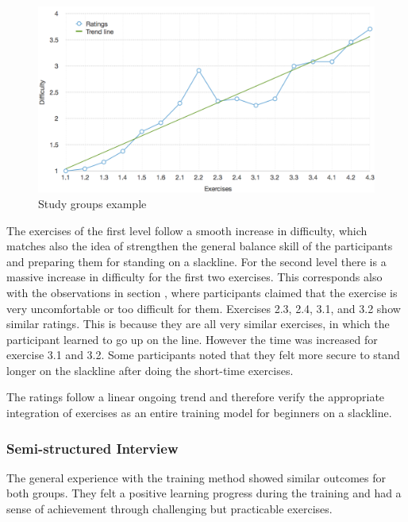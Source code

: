 \begin{figure}[htb]
	\centering
	\begin{minipage}[t]{0.92\linewidth}
		\centering
		\includegraphics[width=1\linewidth]{Pictures/6_4_DIA_ExerciseDifficulty1}
		\caption{Study groups example}
		\label{fig:6_4_exerciseDifficulty}
	\end{minipage}
\end{figure}

The exercises of the first level follow a smooth increase in difficulty, which matches also the idea of strengthen the general balance skill of the participants and preparing them for standing on a slackline.
For the second level there is a massive increase in difficulty for the first two exercises.
This corresponds also with the observations in section \textit{}, where participants claimed that the exercise is very uncomfortable or too difficult for them.
Exercises 2.3, 2.4, 3.1, and 3.2 show similar ratings.
This is because they are all very similar exercises, in which the participant learned to go up on the line.
However the time was increased for exercise 3.1 and 3.2.
Some participants noted that they felt more secure to stand longer on the slackline after doing the short-time exercises.

The ratings follow a linear ongoing trend and therefore verify the appropriate integration of exercises as an entire training model for beginners on a slackline.


\subsubsection{Semi-structured Interview}
The general experience with the training method showed similar outcomes for both groups. 
They felt a positive learning progress during the training and had a sense of achievement through challenging but practicable exercises.

